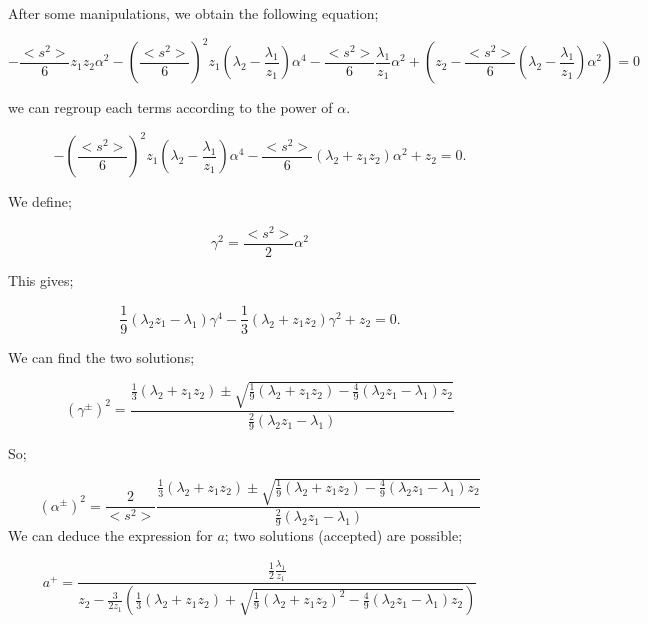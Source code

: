 \documentclass[preprint,12pt]{elsarticle}
\newcommand{\bl}{\big<}
\newcommand{\bg}{\big>}
\begin{document}
After some manipulations, we obtain the following equation;

\begin{equation}
-\frac{\bl s^2 \bg}{6} z_1z_2 \alpha^2 - \left(\frac{\bl s^2 \bg}{6}\right)^2z_1\left(\lambda_2-\frac{\lambda_1}{z_1}\right)\alpha^4-\frac{\bl s^2 \bg}{6}\frac{\lambda_1}{z_1}\alpha^2+\left(z_2-\frac{\bl s^2 \bg}{6}(\lambda_2-\frac{\lambda_1}{z_1})\alpha^2\right)=0
\end{equation}

we can regroup each terms according to the power of $\alpha$.

\begin{equation}
-\left(\frac{\bl s^2 \bg}{6}\right)^2z_1\left(\lambda_2-\frac{\lambda_1}{z_1}\right)\alpha^4-\frac{\bl s^2 \bg}{6}\left(\lambda_2+z_1z_2\right)\alpha^2+z_2 = 0.
\end{equation}

We define;

\begin{equation}
\gamma^2 = \frac{\bl s^2 \bg}{2}\alpha^2
\end{equation}

This gives;

\begin{equation}
\frac{1}{9}\left(\lambda_2z_1-\lambda_1\right)\gamma^4-\frac{1}{3}\left(\lambda_2+z_1z_2\right)\gamma^2+z_2 = 0.
\end{equation}

We can find the two solutions;

\begin{equation}
\left(\gamma^{\pm}\right)^2= \frac{\frac{1}{3}(\lambda_2+z_1z_2) \pm \sqrt{\frac{1}{9}(\lambda_2+z_1z_2) - \frac{4}{9}(\lambda_2z_1-\lambda_1)z_2}}{ \frac{2}{9}(\lambda_2z_1-\lambda_1)}
\end{equation}

So;

\begin{equation}
\left(\alpha^{\pm}\right)^2= \frac{2}{\bl s^2 \bg} \frac{\frac{1}{3}(\lambda_2+z_1z_2) \pm \sqrt{\frac{1}{9}(\lambda_2+z_1z_2) - \frac{4}{9}(\lambda_2z_1-\lambda_1)z_2}}{ \frac{2}{9}(\lambda_2z_1-\lambda_1)}
\end{equation}
We can deduce the expression for $a$; two solutions (accepted) are possible;

\begin{equation}
a^+ = \frac{\frac{1}{2}\frac{\lambda_1}{z_1}}{z_2-\frac{3}{2z_1}\left(\frac{1}{3}\left(\lambda_2+z_1z_2\right) + \sqrt{\frac{1}{9}(\lambda_2+z_1z_2)^2 - \frac{4}{9}(\lambda_2z_1-\lambda_1)z_2}\right)}
\end{equation}
\end{document}
